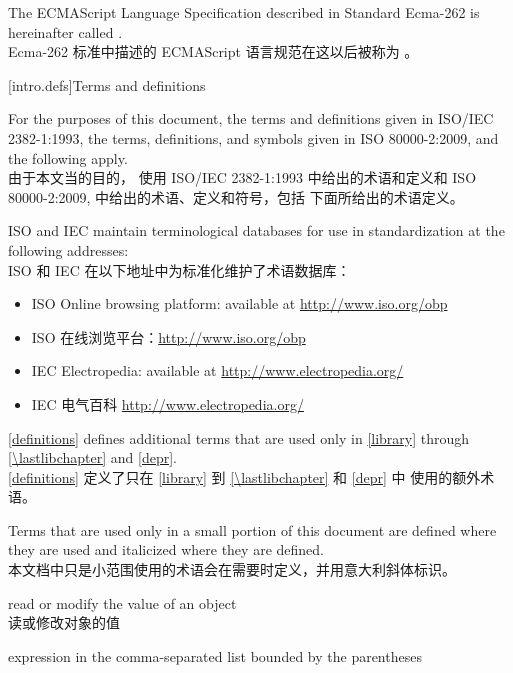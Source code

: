 \pnum
The ECMAScript Language Specification described in Standard Ecma-262 is
hereinafter called . \\
Ecma-262 标准中描述的 ECMAScript 语言规范在这以后被称为 。

[intro.defs]{Terms and definitions}

\pnum
{}%
For the purposes of this document,
the terms and definitions
given in ISO/IEC 2382-1:1993,
the terms, definitions, and symbols
given in ISO 80000-2:2009,
and the following apply. \\
由于本文当的目的，
使用 ISO/IEC 2382-1:1993 中给出的术语和定义和 
ISO 80000-2:2009, 中给出的术语、定义和符号，包括
下面所给出的术语定义。

\pnum
ISO and IEC maintain terminological databases
for use in standardization
at the following addresses:\\
ISO 和 IEC 在以下地址中为标准化维护了术语数据库：
\begin{itemize}
\item ISO Online browsing platform: available at \url{http://www.iso.org/obp}
\item ISO 在线浏览平台：\url{http://www.iso.org/obp}
\item IEC Electropedia: available at \url{http://www.electropedia.org/}
\item IEC 电气百科 \url{http://www.electropedia.org/}
\end{itemize}

\pnum
\ref{definitions}
defines additional terms that are used only in \ref{library}
through \ref{\lastlibchapter} and \ref{depr}. \\
\ref{definitions}
定义了只在 \ref{library} 到 \ref{\lastlibchapter} 和 \ref{depr} 中
使用的额外术语。

\pnum
Terms that are used only in a small portion of this document
are defined where they are used and italicized where they are
defined. \\
本文档中只是小范围使用的术语会在需要时定义，并用意大利斜体标识。

%
 read or modify the value of an object \\
读或修改对象的值

%
 expression in the
comma-separated list bounded by the parentheses

